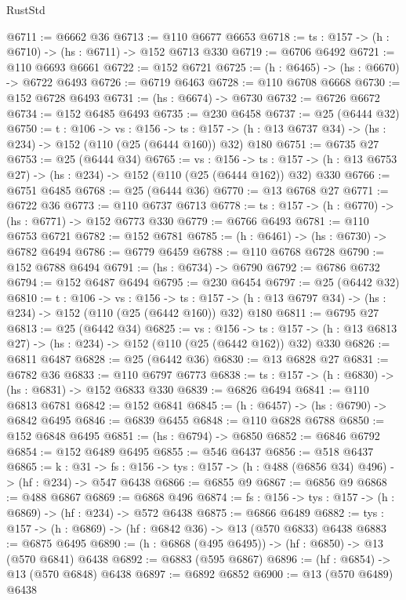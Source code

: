 \begin{lexlean}{RustStd}
\begin{coremodule}
@6711 := @6662 @36
@6713 := @110 @6677 @6653
@6718 := {ts : @157} -> (h : @6710) -> (hs : @6711) -> @152 @6713 @330
@6719 := @6706 @6492
@6721 := @110 @6693 @6661
@6722 := @152 @6721
@6725 := (h : @6465) -> (hs : @6670) -> @6722 @6493
@6726 := @6719 @6463
@6728 := @110 @6708 @6668
@6730 := @152 @6728 @6493
@6731 := (hs : @6674) -> @6730
@6732 := @6726 @6672
@6734 := @152 @6485 @6493
@6735 := @230 @6458
@6737 := @25 (@6444 @32)
@6750 := {t : @106} ->
  {vs : @156} ->
  {ts : @157} -> (h : @13 @6737 @34) -> (hs : @234) -> @152 (@110 (@25 (@6444 @160)) @32) @180
@6751 := @6735 @27
@6753 := @25 (@6444 @34)
@6765 := {vs : @156} ->
  {ts : @157} -> (h : @13 @6753 @27) -> (hs : @234) -> @152 (@110 (@25 (@6444 @162)) @32) @330
@6766 := @6751 @6485
@6768 := @25 (@6444 @36)
@6770 := @13 @6768 @27
@6771 := @6722 @36
@6773 := @110 @6737 @6713
@6778 := {ts : @157} -> (h : @6770) -> (hs : @6771) -> @152 @6773 @330
@6779 := @6766 @6493
@6781 := @110 @6753 @6721
@6782 := @152 @6781
@6785 := (h : @6461) -> (hs : @6730) -> @6782 @6494
@6786 := @6779 @6459
@6788 := @110 @6768 @6728
@6790 := @152 @6788 @6494
@6791 := (hs : @6734) -> @6790
@6792 := @6786 @6732
@6794 := @152 @6487 @6494
@6795 := @230 @6454
@6797 := @25 (@6442 @32)
@6810 := {t : @106} ->
  {vs : @156} ->
  {ts : @157} -> (h : @13 @6797 @34) -> (hs : @234) -> @152 (@110 (@25 (@6442 @160)) @32) @180
@6811 := @6795 @27
@6813 := @25 (@6442 @34)
@6825 := {vs : @156} ->
  {ts : @157} -> (h : @13 @6813 @27) -> (hs : @234) -> @152 (@110 (@25 (@6442 @162)) @32) @330
@6826 := @6811 @6487
@6828 := @25 (@6442 @36)
@6830 := @13 @6828 @27
@6831 := @6782 @36
@6833 := @110 @6797 @6773
@6838 := {ts : @157} -> (h : @6830) -> (hs : @6831) -> @152 @6833 @330
@6839 := @6826 @6494
@6841 := @110 @6813 @6781
@6842 := @152 @6841
@6845 := (h : @6457) -> (hs : @6790) -> @6842 @6495
@6846 := @6839 @6455
@6848 := @110 @6828 @6788
@6850 := @152 @6848 @6495
@6851 := (hs : @6794) -> @6850
@6852 := @6846 @6792
@6854 := @152 @6489 @6495
@6855 := @546 @6437
@6856 := @518 @6437
@6865 := {k : @31} ->
  {fs : @156} -> {tys : @157} -> (h : @488 (@6856 @34) @496) -> (hf : @234) -> @547 @6438
@6866 := @6855 @9
@6867 := @6856 @9
@6868 := @488 @6867
@6869 := @6868 @496
@6874 := {fs : @156} -> {tys : @157} -> (h : @6869) -> (hf : @234) -> @572 @6438
@6875 := @6866 @6489
@6882 := {tys : @157} -> (h : @6869) -> (hf : @6842 @36) -> @13 (@570 @6833) @6438
@6883 := @6875 @6495
@6890 := (h : @6868 (@495 @6495)) -> (hf : @6850) -> @13 (@570 @6841) @6438
@6892 := @6883 (@595 @6867)
@6896 := (hf : @6854) -> @13 (@570 @6848) @6438
@6897 := @6892 @6852
@6900 := @13 (@570 @6489) @6438

\end{coremodule}
\end{lexlean}
